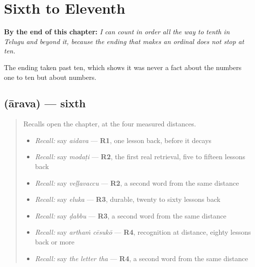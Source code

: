 
\chapter{Sixth to Eleventh}
\label{ch:te-ordinals-to-tenth}

\begin{chapteropening}
\textbf{By the end of this chapter:} \emph{I can count in order all the way to tenth in Telugu and beyond it, because the ending that makes an ordinal does not stop at ten.}

The ending taken past ten, which shows it was never a fact about the numbers one to ten but about numbers.
\end{chapteropening}

\section[\texorpdfstring{\te{ఆరవ} (ārava)}{ఆరవ (ārava)}]{ (ārava) — sixth}

\label{lesson:TE-C82-sixth}



\begin{quote}
Recalls open the chapter, at the four measured distances.

\begin{itemize}
\raggedright
  \item \emph{Recall:} say \emph{aidava} — \textbf{R1}, one lesson back, before it decays
  \item \emph{Recall:} say \emph{modaṭi} — \textbf{R2}, the first real retrieval, five to fifteen lessons back
  \item \emph{Recall:} say \emph{veḷḷavaccu} — \textbf{R2}, a second word from the same distance
  \item \emph{Recall:} say \emph{eluka} — \textbf{R3}, durable, twenty to sixty lessons back
  \item \emph{Recall:} say \emph{ḍabbu} — \textbf{R3}, a second word from the same distance
  \item \emph{Recall:} say \emph{arthaṁ cēsukō} — \textbf{R4}, recognition at distance, eighty lessons back or more
  \item \emph{Recall:} say \emph{the letter tha} — \textbf{R4}, a second word from the same distance
\end{itemize}
\end{quote}

